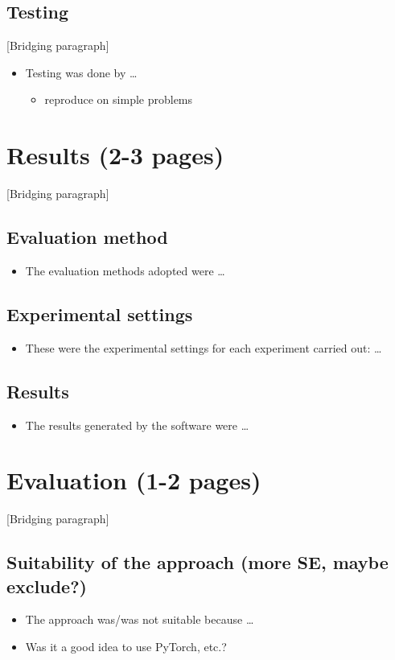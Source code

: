 \documentclass[12pt,a4paper]{article}
\begin{document}
\subsection{Testing}
[Bridging paragraph]
\begin{itemize}
    \item Testing was done by \dots
    \begin{itemize}
        \item reproduce on simple problems
    \end{itemize}
\end{itemize}

\section{Results (2-3 pages)}
[Bridging paragraph]
\subsection{Evaluation method}
\begin{itemize}
    \item The evaluation methods adopted were \dots
\end{itemize}

\subsection{Experimental settings}
\begin{itemize}
    \item These were the experimental settings for each experiment carried out: \dots
\end{itemize}

\subsection{Results}
\begin{itemize}
    \item The results generated by the software were \dots
\end{itemize}

\section{Evaluation (1-2 pages)}
[Bridging paragraph]
\subsection{Suitability of the approach (more SE, maybe exclude?)}
\begin{itemize}
    \item The approach was/was not suitable because \dots
    \item Was it a good idea to use PyTorch, etc.?
\end{itemize}
\end{document}
